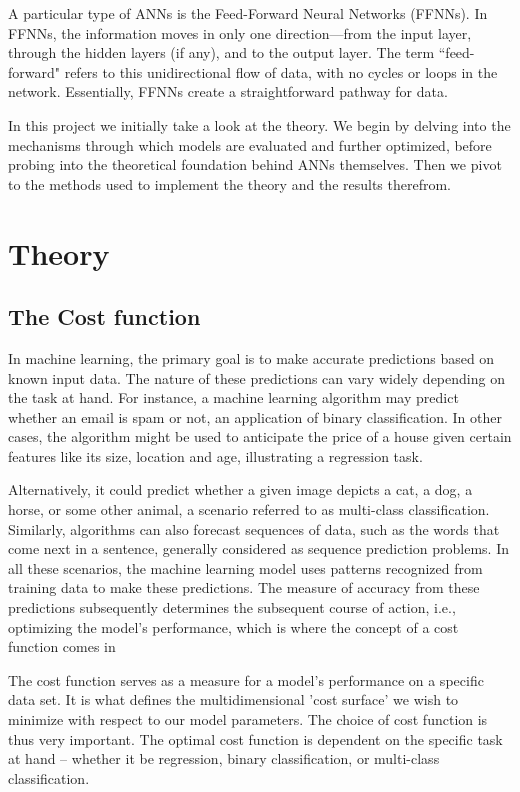 \documentclass{article}
\theoremstyle{definition}
\begin{document}
A particular type of ANNs is the Feed-Forward Neural Networks (FFNNs). In FFNNs, the information moves in only one direction—from the input layer, through the hidden layers (if any), and to the output layer. The term ``feed-forward" refers to this unidirectional flow of data, with no cycles or loops in the network. Essentially, FFNNs create a straightforward pathway for data.

In this project we initially take a look at the theory. We begin by delving into the mechanisms through which models are evaluated and further optimized, before probing into the theoretical foundation behind ANNs themselves. Then we pivot to the methods used to implement the theory and the results therefrom.

\newpage

\section{Theory}

\subsection{The Cost function}
In machine learning, the primary goal is to make accurate predictions based on known input data. The nature of these predictions can vary widely depending on the task at hand. For instance, a machine learning algorithm may predict whether an email is spam or not, an application of binary classification. In other cases, the algorithm might be used to anticipate the price of a house given certain features like its size, location and age, illustrating a regression task.

Alternatively, it could predict whether a given image depicts a cat, a dog, a horse, or some other animal, a scenario referred to as multi-class classification. Similarly, algorithms can also forecast sequences of data, such as the words that come next in a sentence, generally considered as sequence prediction problems. In all these scenarios, the machine learning model uses patterns recognized from training data to make these predictions. The measure of accuracy from these predictions subsequently determines the subsequent course of action, i.e., optimizing the model's performance, which is where the concept of a cost function comes in


The cost function serves as a measure for a model's performance on a specific data set. It is what defines the multidimensional 'cost surface' we wish to minimize with respect to our model parameters. The choice of cost function is thus very important. The optimal cost function is dependent on the specific task at hand – whether it be regression, binary classification, or multi-class classification.
\end{document}
